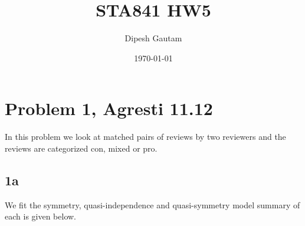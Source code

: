 \documentclass{article}
\begin{document}

\title{STA841 HW5}
\author{Dipesh Gautam}
\date{\today}
\maketitle

\section{Problem 1, Agresti 11.12}
In this problem we look at matched pairs of reviews by two reviewers and the reviews are categorized con, mixed or pro.
\subsection{1a}
We fit the symmetry, quasi-independence and quasi-symmetry model summary of each is given below.
\end{document}
